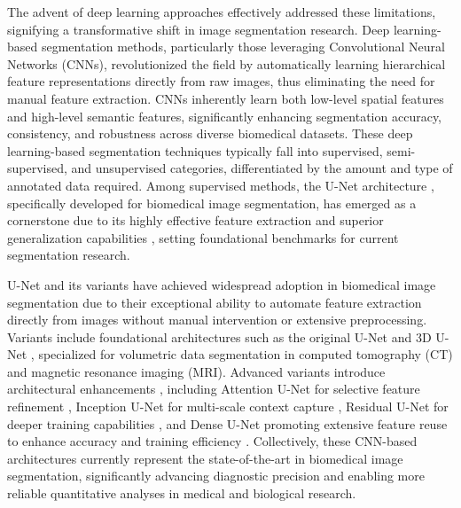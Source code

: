 \documentclass[./dissertation.tex]{subfiles}
\begin{document}
The advent of deep learning approaches effectively addressed these limitations, signifying a transformative shift in image segmentation research. Deep learning-based segmentation methods, particularly those leveraging Convolutional Neural Networks (CNNs), revolutionized the field by automatically learning hierarchical feature representations directly from raw images, thus eliminating the need for manual feature extraction. CNNs inherently learn both low-level spatial features and high-level semantic features, significantly enhancing segmentation accuracy, consistency, and robustness across diverse biomedical datasets. These deep learning-based segmentation techniques typically fall into supervised, semi-supervised, and unsupervised categories, differentiated by the amount and type of annotated data required. Among supervised methods, the U-Net architecture \cite{ronneberger2015u}, specifically developed for biomedical image segmentation, has emerged as a cornerstone due to its highly effective feature extraction and superior generalization capabilities \cite{chen2021transunet}, setting foundational benchmarks for current segmentation research.

U-Net and its variants have achieved widespread adoption in biomedical image segmentation due to their exceptional ability to automate feature extraction directly from images without manual intervention or extensive preprocessing. Variants include foundational architectures such as the original U-Net \cite{ronneberger2015u} and 3D U-Net \cite{cciccek20163d}, specialized for volumetric data segmentation in computed tomography (CT) and magnetic resonance imaging (MRI). Advanced variants introduce architectural enhancements \cite{cao2022swin}, including Attention U-Net for selective feature refinement \cite{oktay2018attention}, Inception U-Net for multi-scale context capture \cite{zhang2020munet}, Residual U-Net for deeper training capabilities \cite{alom2018recurrent}, and Dense U-Net promoting extensive feature reuse to enhance accuracy and training efficiency \cite{guan2019fully}. Collectively, these CNN-based architectures currently represent the state-of-the-art in biomedical image segmentation, significantly advancing diagnostic precision and enabling more reliable quantitative analyses in medical and biological research.
\end{document}
